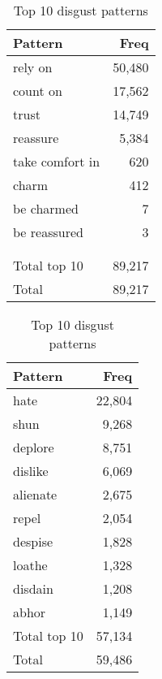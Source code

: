 \begin{table}[!htb]
    \begin{minipage}{.45\linewidth}
		\centering
		\begin{tabular}{l|r}
			{\bf Pattern}   & {\bf Freq} \\\hline
			rely on         & 50,480          \\
			count on        & 17,562          \\
			trust           & 14,749          \\
			reassure        & 5,384           \\
			take comfort in & 620             \\
			charm           & 412             \\
			be charmed      & 7               \\
			be reassured    & 3               \\
			                &                 \\
			                &                 \\\hline
			Total top 10    & 89,217          \\
			Total           & 89,217         
		\end{tabular}
		\caption{Top 10 trust patterns}
		\label{tab:trust-patterns}
    \end{minipage}
    \begin{minipage}{.45\linewidth}
		\centering
		\begin{tabular}{l|r}
			{\bf Pattern} & {\bf Freq} \\\hline
			hate          & 22,804          \\
			shun          & 9,268           \\
			deplore       & 8,751           \\
			dislike       & 6,069           \\
			alienate      & 2,675           \\
			repel         & 2,054           \\
			despise       & 1,828           \\
			loathe        & 1,328           \\
			disdain       & 1,208           \\
			abhor         & 1,149           \\\hline
			Total top 10  & 57,134           \\
			Total         & 59,486          
		\end{tabular}
		\caption{Top 10 disgust patterns}
		\label{tab:disgust-patterns}
    \end{minipage}
\end{table}

